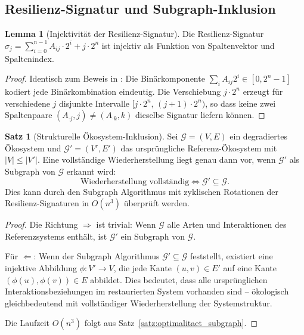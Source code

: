 ﻿\documentclass[a4paper,12pt]{article}
\theoremstyle{definition}
\newtheorem{satz}{Satz}
\newtheorem{lemma}{Lemma}
\begin{document}
\subsection{Resilienz-Signatur und Subgraph-Inklusion}

\begin{lemma}[Injektivität der Resilienz-Signatur]
	Die Resilienz-Signatur $\sigma_j = \sum_{i=0}^{n-1} A_{ij} \cdot 2^i + j \cdot 2^n$ ist injektiv als Funktion von Spaltenvektor und Spaltenindex.
\end{lemma}

\begin{proof}
	Identisch zum Beweis in \cite{epp2026subgraph}: Die Binärkomponente $\sum_i A_{ij} 2^i \in [0, 2^n - 1]$ kodiert jede Binärkombination eindeutig. Die Verschiebung $j \cdot 2^n$ erzeugt für verschiedene $j$ disjunkte Intervalle $[j\cdot 2^n,\, (j+1)\cdot 2^n)$, so dass keine zwei Spaltenpaare $(A_{\cdot j}, j) \neq (A_{\cdot k}, k)$ dieselbe Signatur liefern können. \qedhere
\end{proof}

\begin{satz}[Strukturelle Ökosystem-Inklusion]
	Sei $\mathcal{G} = (V, E)$ ein degradiertes Ökosystem und $\mathcal{G}' = (V', E')$ das ursprüngliche Referenz-Ökosystem mit $|V| \leq |V'|$. Eine vollständige Wiederherstellung liegt genau dann vor, wenn $\mathcal{G}'$ als Subgraph von $\mathcal{G}$ erkannt wird:
	\[
	\text{Wiederherstellung vollständig} \iff \mathcal{G}' \subseteq \mathcal{G}.
	\]
	Dies kann durch den Subgraph Algorithmus mit zyklischen Rotationen der Resilienz-Signaturen in $O(n^3)$ überprüft werden.
\end{satz}

\begin{proof}
	Die Richtung $\Rightarrow$ ist trivial: Wenn $\mathcal{G}$ alle Arten und Interaktionen des Referenzsystems enthält, ist $\mathcal{G}'$ ein Subgraph von $\mathcal{G}$.

	Für $\Leftarrow$: Wenn der Subgraph Algorithmus $\mathcal{G}' \subseteq \mathcal{G}$ feststellt, existiert eine injektive Abbildung $\phi: V' \to V$, die jede Kante $(u,v) \in E'$ auf eine Kante $(\phi(u), \phi(v)) \in E$ abbildet. Dies bedeutet, dass alle ursprünglichen Interaktionsbeziehungen im restaurierten System vorhanden sind -- ökologisch gleichbedeutend mit vollständiger Wiederherstellung der Systemstruktur.

	Die Laufzeit $O(n^3)$ folgt aus Satz~\ref{satz:optimalitaet_subgraph}. \qedhere
\end{proof}
\end{document}
